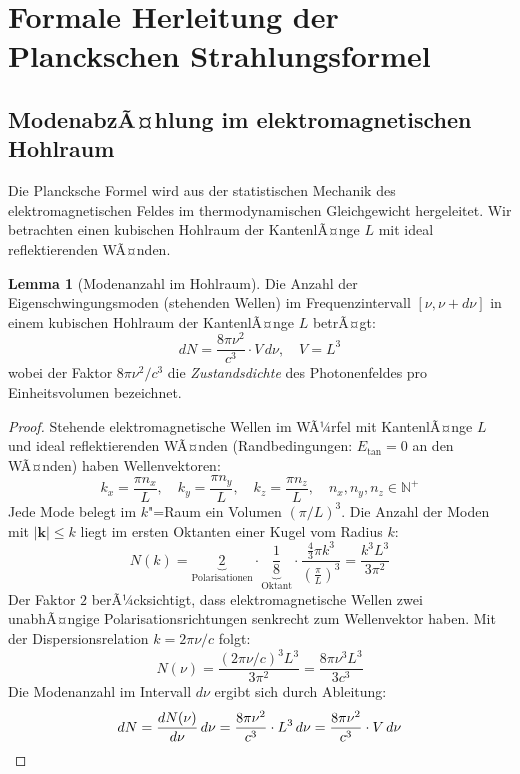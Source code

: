 ﻿\documentclass[a4paper,12pt]{article}
\theoremstyle{definition}
\newtheorem{lemma}{Lemma}
\begin{document}
\section{Formale Herleitung der Planckschen Strahlungsformel}

\subsection{ModenabzÃ¤hlung im elektromagnetischen Hohlraum}

Die Plancksche Formel wird aus der statistischen Mechanik des elektromagnetischen
Feldes im thermodynamischen Gleichgewicht hergeleitet. Wir betrachten einen
kubischen Hohlraum der KantenlÃ¤nge $L$ mit ideal reflektierenden WÃ¤nden.

\begin{lemma}[Modenanzahl im Hohlraum]
\label{lem:moden}
    Die Anzahl der Eigenschwingungsmoden (stehenden Wellen) im Frequenzintervall
    $[\nu, \nu + d\nu]$ in einem kubischen Hohlraum der KantenlÃ¤nge $L$ betrÃ¤gt:
    \[
        dN = \frac{8\pi \nu^2}{c^3} \cdot V \, d\nu, \quad V = L^3
    \]
    wobei der Faktor $8\pi\nu^2/c^3$ die \emph{Zustandsdichte} des Photonenfeldes
    pro Einheitsvolumen bezeichnet.
\end{lemma}

\begin{proof}
    Stehende elektromagnetische Wellen im WÃ¼rfel mit KantenlÃ¤nge $L$ und
    ideal reflektierenden WÃ¤nden (Randbedingungen: $E_{\text{tan}} = 0$ an
    den WÃ¤nden) haben Wellenvektoren:
    \[
        k_x = \frac{\pi n_x}{L},\quad k_y = \frac{\pi n_y}{L},\quad
        k_z = \frac{\pi n_z}{L}, \quad n_x, n_y, n_z \in \mathbb{N}^+
    \]
    Jede Mode belegt im $k$"=Raum ein Volumen $(\pi/L)^3$.
    Die Anzahl der Moden mit $|\mathbf{k}| \leq k$ liegt im ersten Oktanten
    einer Kugel vom Radius $k$:
    \[
        N(k) = \underbrace{2}_{\text{Polarisationen}} \cdot
        \underbrace{\frac{1}{8}}_{\text{Oktant}} \cdot
        \frac{\tfrac{4}{3}\pi k^3}{\left(\tfrac{\pi}{L}\right)^3}
        = \frac{k^3 L^3}{3\pi^2}
    \]
    Der Faktor $2$ berÃ¼cksichtigt, dass elektromagnetische Wellen zwei
    unabhÃ¤ngige Polarisationsrichtungen senkrecht zum Wellenvektor haben.
    Mit der Dispersionsrelation $k = 2\pi\nu/c$ folgt:
    \[
        N(\nu) = \frac{(2\pi\nu/c)^3 L^3}{3\pi^2} = \frac{8\pi\nu^3 L^3}{3c^3}
    \]
    Die Modenanzahl im Intervall $d\nu$ ergibt sich durch Ableitung:
    \[
        dN = \frac{dN(\nu)}{d\nu}\,d\nu
        = \frac{8\pi\nu^2}{c^3} \cdot L^3 \, d\nu
        = \frac{8\pi\nu^2}{c^3} \cdot V \, d\nu \qedhere
    \]
\end{proof}
\end{document}
